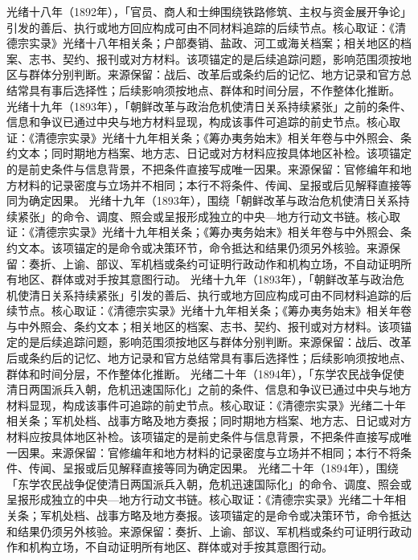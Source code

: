 光绪十八年（1892年），「官员、商人和士绅围绕铁路修筑、主权与资金展开争论」引发的善后、执行或地方回应构成可由不同材料追踪的后续节点。核心取证：《清德宗实录》光绪十八年相关条；户部奏销、盐政、河工或海关档案；相关地区的档案、志书、契约、报刊或对方材料。该项锚定的是后续追踪问题，影响范围须按地区与群体分别判断。来源保留：战后、改革后或条约后的记忆、地方记录和官方总结常具有事后选择性；后续影响须按地点、群体和时间分层，不作整体化推断。
光绪十九年（1893年），「朝鲜改革与政治危机使清日关系持续紧张」之前的条件、信息和争议已通过中央与地方材料显现，构成该事件可追踪的前史节点。核心取证：《清德宗实录》光绪十九年相关条；《筹办夷务始末》相关年卷与中外照会、条约文本；同时期地方档案、地方志、日记或对方材料应按具体地区补检。该项锚定的是前史条件与信息背景，不把条件直接写成唯一因果。来源保留：官修编年和地方材料的记录密度与立场并不相同；本行不将条件、传闻、呈报或后见解释直接等同为确定因果。
光绪十九年（1893年），围绕「朝鲜改革与政治危机使清日关系持续紧张」的命令、调度、照会或呈报形成独立的中央—地方行动文书链。核心取证：《清德宗实录》光绪十九年相关条；《筹办夷务始末》相关年卷与中外照会、条约文本。该项锚定的是命令或决策环节，命令抵达和结果仍须另外核验。来源保留：奏折、上谕、部议、军机档或条约可证明行政动作和机构立场，不自动证明所有地区、群体或对手按其意图行动。
光绪十九年（1893年），「朝鲜改革与政治危机使清日关系持续紧张」引发的善后、执行或地方回应构成可由不同材料追踪的后续节点。核心取证：《清德宗实录》光绪十九年相关条；《筹办夷务始末》相关年卷与中外照会、条约文本；相关地区的档案、志书、契约、报刊或对方材料。该项锚定的是后续追踪问题，影响范围须按地区与群体分别判断。来源保留：战后、改革后或条约后的记忆、地方记录和官方总结常具有事后选择性；后续影响须按地点、群体和时间分层，不作整体化推断。
光绪二十年（1894年），「东学农民战争促使清日两国派兵入朝，危机迅速国际化」之前的条件、信息和争议已通过中央与地方材料显现，构成该事件可追踪的前史节点。核心取证：《清德宗实录》光绪二十年相关条；军机处档、战事方略及地方奏报；同时期地方档案、地方志、日记或对方材料应按具体地区补检。该项锚定的是前史条件与信息背景，不把条件直接写成唯一因果。来源保留：官修编年和地方材料的记录密度与立场并不相同；本行不将条件、传闻、呈报或后见解释直接等同为确定因果。
光绪二十年（1894年），围绕「东学农民战争促使清日两国派兵入朝，危机迅速国际化」的命令、调度、照会或呈报形成独立的中央—地方行动文书链。核心取证：《清德宗实录》光绪二十年相关条；军机处档、战事方略及地方奏报。该项锚定的是命令或决策环节，命令抵达和结果仍须另外核验。来源保留：奏折、上谕、部议、军机档或条约可证明行政动作和机构立场，不自动证明所有地区、群体或对手按其意图行动。
